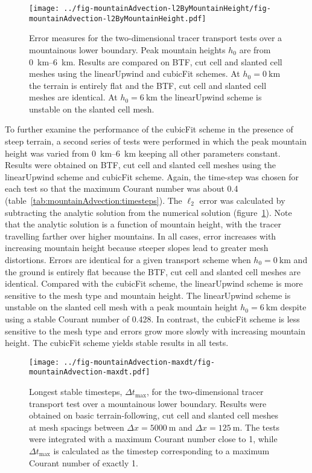 \begin{figure}
	\centering
	\texttt{[image: ../fig-mountainAdvection-l2ByMountainHeight/fig-mountainAdvection-l2ByMountainHeight.pdf]}
%
	\caption{Error measures for the two-dimensional tracer transport tests over a mountainous lower boundary.  Peak mountain heights $h_0$ are from \SIrange{0}{6}{\kilo\meter}.  Results are compared on BTF, cut cell and slanted cell meshes using the linearUpwind and cubicFit schemes.  At $h_0 = \SI{0}{\kilo\meter}$ the terrain is entirely flat and the BTF, cut cell and slanted cell meshes are identical.  At $h_0 = \SI{6}{\kilo\meter}$ the linearUpwind scheme is unstable on the slanted cell mesh.}
	\label{fig:mountainAdvection-l2ByMountainHeight}
\end{figure}

To further examine the performance of the cubicFit scheme in the presence of steep terrain, a second series of tests were performed in which the peak mountain height was varied from \SIrange{0}{6}{\kilo\meter} keeping all other parameters constant.
Results were obtained on BTF, cut cell and slanted cell meshes using the linearUpwind scheme and cubicFit scheme.  Again, the time-step was chosen for each test so that the maximum Courant number was about \num{0.4} (table~\ref{tab:mountainAdvection:timesteps}).  The $\ell_2$ error was calculated by subtracting the analytic solution from the numerical solution (figure~\ref{fig:mountainAdvection-l2ByMountainHeight}).
Note that the analytic solution is a function of mountain height, with the tracer travelling farther over higher mountains.
In all cases, error increases with increasing mountain height because steeper slopes lead to greater mesh distortions.
Errors are identical for a given transport scheme when $h_0 = \SI{0}{\kilo\meter}$ and the ground is entirely flat because the BTF, cut cell and slanted cell meshes are identical.
Compared with the cubicFit scheme, the linearUpwind scheme is more sensitive to the mesh type and mountain height.  The linearUpwind scheme is unstable on the slanted cell mesh with a peak mountain height $h_0 = \SI{6}{\kilo\meter}$ despite using a stable Courant number of \num{0.428}.
In contrast, the cubicFit scheme is less sensitive to the mesh type and errors grow more slowly with increasing mountain height.  The cubicFit scheme yields stable results in all tests.

\begin{figure}
	\centering
	\texttt{[image: ../fig-mountainAdvection-maxdt/fig-mountainAdvection-maxdt.pdf]}
	\caption{Longest stable timesteps, $\Delta t_\mathrm{max}$, for the two-dimensional tracer transport test over a mountainous lower boundary.  Results were obtained on basic terrain-following, cut cell and slanted cell meshes at mesh spacings between $\Delta x = \SI{5000}{\meter}$ and $\Delta x = \SI{125}{\meter}$.  The tests were integrated with a maximum Courant number close to 1, while $\Delta t_\mathrm{max}$ is calculated as the timestep corresponding to a maximum Courant number of exactly 1.}
	\label{fig:mountainAdvection-maxdt}
\end{figure}

